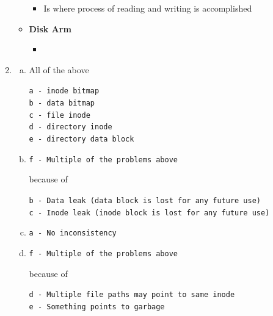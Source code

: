 \documentclass[12pt]{article}
\begin{document}
\begin{enumerate}[1.]
\begin{itemize}
        \begin{itemize}
            \item Is where process of reading and writing is accomplished
        \end{itemize}

        \item \textbf{Disk Arm}

        \begin{itemize}
            \item
        \end{itemize}
    \end{itemize}

    \item

    \begin{enumerate}[a)]
        \item

        All of the above

        \texttt{a - inode bitmap}\\
        \texttt{b - data bitmap}\\
        \texttt{c - file inode}\\
        \texttt{d - directory inode}\\
        \texttt{e - directory data block}

        \item
        \texttt{f - Multiple of the problems above}

        \bigskip

        because of

        \bigskip

        \texttt{b - Data leak (data block is lost for any future use)}\\
        \texttt{c - Inode leak (inode block is lost for any future use)}

        \item

        \texttt{a - No inconsistency}

        \item

        \texttt{f - Multiple of the problems above}

        \bigskip

        because of

        \bigskip

        \texttt{d - Multiple file paths may point to same inode}\\
        \texttt{e - Something points to garbage}


\end{enumerate}
\end{enumerate}
\end{document}
